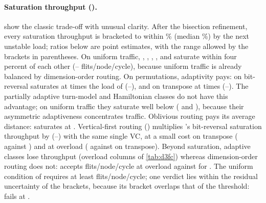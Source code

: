 \paragraph{Saturation throughput ().}  show the classic trade-off with unusual clarity. After the bisection refinement, every saturation throughput is bracketed to within \% (median \%) by the next unstable load; ratios below are point estimates, with the range allowed by the brackets in parentheses. On uniform traffic, , , , ,  and  saturate within four percent of each other (-- flits/node/cycle), because uniform traffic is already balanced by dimension-order routing. On permutations, adaptivity pays: on bit-reversal  saturates at  times the load of  (--), and on transpose at  times (--). The partially adaptive turn-model and Hamiltonian classes do not have this advantage; on uniform traffic they saturate well below  ( and ), because their asymmetric adaptiveness concentrates traffic. Oblivious routing pays its average distance:  saturates at . Vertical-first routing () multiplies 's bit-reversal saturation throughput by  (--) with the same single VC, at a small cost on transpose ( against ) and at overload ( against  on transpose). Beyond saturation, adaptive classes lose throughput (overload columns of \cref{tab:d3fc}) whereas dimension-order routing does not:  accepts  flits/node/cycle at overload against  for . The uniform condition of  requires at least  flits/node/cycle; one verdict lies within the residual uncertainty of the brackets, because its bracket overlaps that of the threshold:  fails at .

\begin{table}[tbp]
\centering
\caption{Performance of 3D-FC classes (). Zero-load latency at PIR 0.002; saturation throughput in flits/node/cycle (highest accepted throughput with at most 1\% undelivered and no deadlock, over the coarse sweep and its bisection refinement); overload throughput accepted at an offered load of 0.6 flits/node/cycle.}
\label{tab:d3fc}
\small

\end{table}

